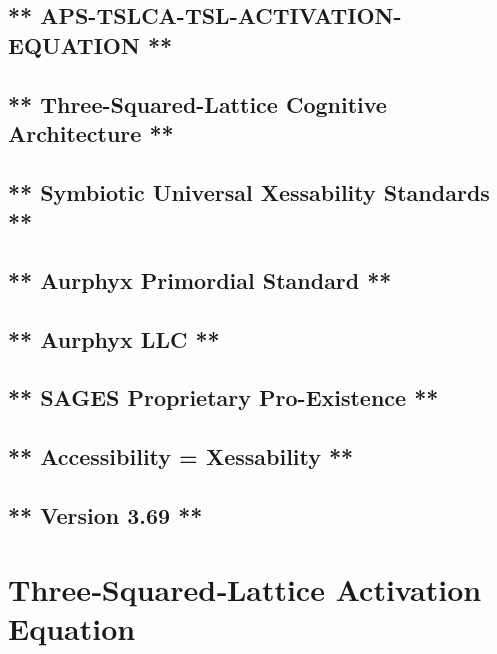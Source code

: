 \subsection{** APS-TSLCA-TSL-ACTIVATION-EQUATION **}\label{aps-tslca-tsl-activation-equation}

\subsection{** Three-Squared-Lattice Cognitive Architecture **}\label{three-squared-lattice-cognitive-architecture}

\subsection{** Symbiotic Universal Xessability Standards **}\label{symbiotic-universal-xessability-standards}

\subsection{** Aurphyx Primordial Standard **}\label{aurphyx-primordial-standard}

\subsection{** Aurphyx LLC **}\label{aurphyx-llc}

\subsection{** SAGES \textbar{} Proprietary \textbar{} Pro-Existence **}\label{sages-proprietary-pro-existence}

\subsection{** Accessibility = Xessability **}\label{accessibility-xessability}

\subsection{** Version 3.69 **}\label{version-3.69}

\section{Three‑Squared‑Lattice Activation Equation}\label{threesquaredlattice-activation-equation}


